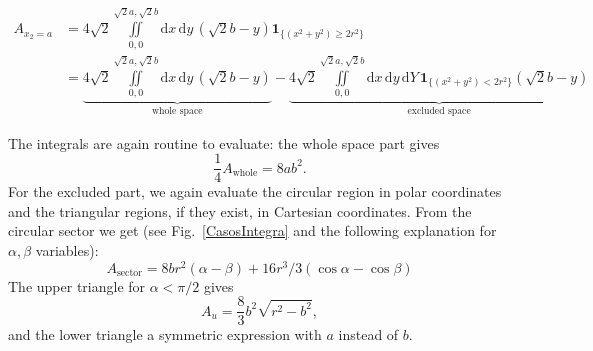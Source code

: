 \documentclass[superscriptaddress,pre,reprint,showpacs,twocolumn]{revtex4-1}
\newcommand{\rd}[1]{\mathrm{d}{#1} \,}
\newcommand{\indicatorsymbol}{\mathbf{1}}
\newcommand{\indicator}[1]{\indicatorsymbol_{ \{   #1 \} } }
\begin{document}
    \begin{widetext}
    \begin{align}
      A_{x_2=a} & =4\sqrt{2}\iint \limits_{0,0}^{\sqrt{2}a,\sqrt{2}b}
        \rd x \rd y (\sqrt{2} b - y)
        \indicator{(x^2+y^2) \geq 2 r^2}\\
     &=\underbrace{4\sqrt{2}\iint \limits _{0,0}^{\sqrt{2}a,\sqrt{2}b}
        \rd x \rd y (\sqrt{2} b - y)}_{\text{whole space}}
        -\underbrace{
          4\sqrt{2}\iint \limits_{0,0}^{\sqrt{2}a,\sqrt{2}b}
        \rd x \rd y \rd Y 
        \indicator{(x^2+y^2) < 2 r^2}(\sqrt{2} b - y)}_{\text{excluded space}}
    \end{align}
    \end{widetext}
    The integrals are again routine to evaluate: the whole space part
    gives
    \begin{equation}
      \frac{1}{4}A_{\text{whole}}=8ab^2.
    \end{equation}
    For the excluded part, we again evaluate the circular region
    in polar coordinates and the triangular regions, if they exist, in Cartesian coordinates.
    From the circular sector we get (see Fig.~\ref{CasosIntegra} and the following explanation
    for $\alpha, \beta$ variables):
    \begin{equation}
      A_{\mathrm{sector}}=8 b r^2(\alpha-\beta)+16r^3/3(\cos\alpha - \cos\beta)
    \end{equation}
    The upper triangle for $\alpha < \pi/2$ gives
    \begin{equation}
    A_{u}=\frac{8}{3}b^2\sqrt{r^2-b^2},
    \end{equation}
    and the lower triangle a symmetric expression with $a$ instead of $b$.


\end{document}
